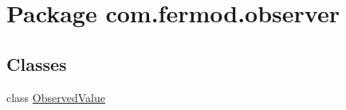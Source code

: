 \hypertarget{namespacecom_1_1fermod_1_1observer}{}\section{Package com.\+fermod.\+observer}
\label{namespacecom_1_1fermod_1_1observer}
\subsection*{Classes}
\begin{DoxyCompactItemize}
\item 
class \mbox{\hyperlink{classcom_1_1fermod_1_1observer_1_1ObservedValue}{Observed\+Value}}
\end{DoxyCompactItemize}
